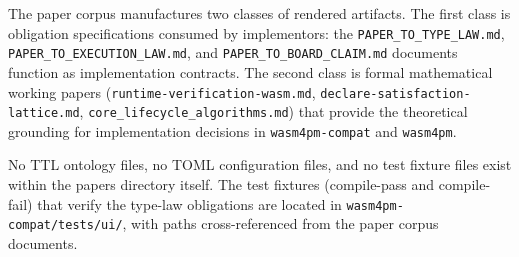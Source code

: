 The paper corpus manufactures two classes of rendered artifacts. The first
class is obligation specifications consumed by implementors: the
\texttt{PAPER\_TO\_TYPE\_LAW.md}, \texttt{PAPER\_TO\_EXECUTION\_LAW.md}, and
\texttt{PAPER\_TO\_BOARD\_CLAIM.md} documents function as implementation
contracts. The second class is formal mathematical working papers
(\texttt{runtime-verification-wasm.md}, \texttt{declare-satisfaction-lattice.md},
\texttt{core\_lifecycle\_algorithms.md}) that provide the theoretical grounding
for implementation decisions in \texttt{wasm4pm-compat} and \texttt{wasm4pm}.

No TTL ontology files, no TOML configuration files, and no test fixture files
exist within the papers directory itself. The test fixtures (compile-pass and
compile-fail) that verify the type-law obligations are located in
\texttt{wasm4pm-compat/tests/ui/}, with paths cross-referenced from the paper
corpus documents.
